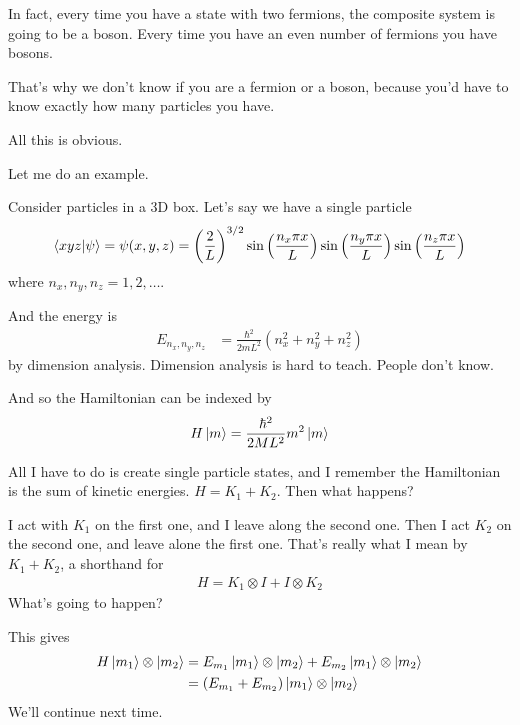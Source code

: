 In fact,
every time you have a state with two fermions,
the composite system is going to be a boson.
Every time you have an even number of fermions you have bosons.

That's why we don't know if you are a fermion or a boson,
because you'd have to know exactly how many particles you have.

All this is obvious.

Let me do an example.

Consider particles in a 3D box.
Let's say we have a single particle
\begin{align}
    \braket{xyz}{\psi} = \psi(x, y, z) =
    \left( \frac{2}{L} \right)^{3/2}
    \sin\left( \frac{n_x \pi x}{L} \right)
    \sin\left( \frac{n_y \pi x}{L} \right)
    \sin\left( \frac{n_z \pi x}{L} \right)
\end{align}
where $n_x,n_y,n_z=1,2,\ldots$.

And the energy is
\begin{align}
    E_{n_x,n_y,n_z} &=
    \frac{\hbar^2}{2mL^2}\left(
        n_x^2 + n_y^2 + n_z^2
    \right)
\end{align}
by dimension analysis.
Dimension analysis is hard to teach.
People don't know.

And so the Hamiltonian can be indexed by
\begin{align}
    H\ket{m} =  \frac{\hbar^2}{2ML^2} m^2 \ket{m}
\end{align}

All I have to do is create single particle states,
and I remember the Hamiltonian is the sum of kinetic energies.
$H=K_1 + K_2$.
Then what happens?

I act with $K_1$ on the first one,
and I leave along the second one.
Then I act $K_2$ on the second one,
and leave alone the first one.
That's really what I mean by $K_1 + K_2$,
a shorthand for
\begin{align}
    H = K_1\otimes I + I\otimes K_2
\end{align}
What's going to happen?

This gives
\begin{align}
    H\ket{m_1}\otimes\ket{m_2} &=
    E_{m_1}\ket{m_1}\otimes\ket{m_2} +
    E_{m_2}\ket{m_1}\otimes\ket{m_2}\\
    &=
    \left( E_{m_1} + E_{m_2} \right)
    \ket{m_1}\otimes\ket{m_2}
\end{align}
We'll continue next time.
